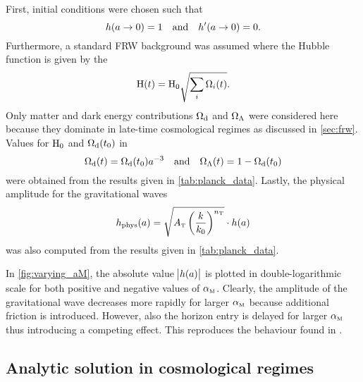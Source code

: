 \documentclass[12pt,parskip=half]{scrreprt}
\begin{document}
First, initial conditions were chosen such that
\begin{equation}
	h(a \to 0) = 1 \quad \text{and} \quad h^\prime(a \to 0) = 0 \mathpunct{.}
\end{equation}
Furthermore, a standard FRW background was assumed where the Hubble function is given by the 
\begin{equation}
	\mathrm{H}(t) = \mathrm{H}_0 \sqrt{\sum_i\Omega_i(t)}
	\mathpunct{.}
\end{equation}
Only matter and dark energy contributions \(\Omega_{\mathrm{d}}\) and \(\Omega_\Lambda\) were considered here because they dominate in late-time cosmological regimes as discussed in \autoref{sec:frw}. Values for \(\mathrm{H}_0\) and \(\Omega_{\mathrm{d}}(t_0)\) in
\begin{equation}
	\Omega_{\mathrm{d}}(t) = \Omega_{\mathrm{d}}(t_0) a^{-3} \quad \text{and} \quad \Omega_\Lambda(t) = 1 - \Omega_{\mathrm{d}}(t_0)
\end{equation}
were obtained from the \cite{Planck}  results given in \autoref{tab:planck_data}.
Lastly, the physical amplitude for the gravitational waves
\begin{equation}
	h_\textnormal{phys}(a) = \sqrt{A_\tenspert\del{\frac{k}{k_0}}^{n_\tenspert}} \cdot h(a)
\end{equation}
was also computed from the \cite{Planck}  results given in \autoref{tab:planck_data}. 


In \autoref{fig:varying_aM}, the absolute value \(\abs{h(a)}\) is plotted in double-logarithmic scale  for both positive and negative values of \({\alpha_{\textnormal{\tiny{M}}}}\). Clearly, the amplitude of the gravitational wave decreases more rapidly for larger \({\alpha_{\textnormal{\tiny{M}}}}\) because additional friction is introduced. However, also the horizon entry is delayed for larger \({\alpha_{\textnormal{\tiny{M}}}}\) thus introducing a competing effect. This reproduces the behaviour found in \cite{Pettorino2014}. 


\subsection{Analytic solution in cosmological regimes}
\end{document}
